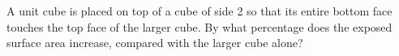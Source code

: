 A unit cube is placed on top of a cube of side 2 so that its entire bottom face touches the top face of the larger cube. By what percentage does the exposed surface area increase, compared with the larger cube alone?
